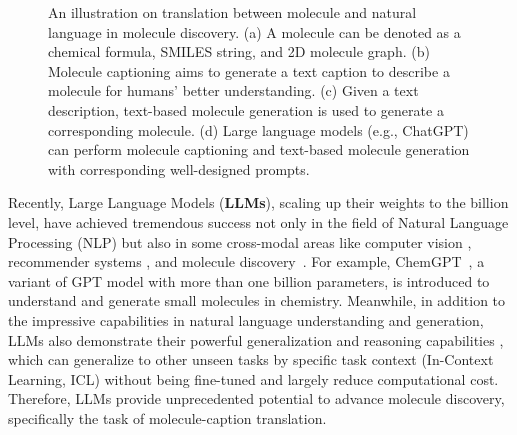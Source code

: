 \documentclass{article}
\theoremstyle{plain}
\theoremstyle{definition}
\theoremstyle{remark}
\begin{document}
\begin{figure}[t]
\centering
\begin{minipage}{3cm}
\vspace{1cm}
\end{minipage}
\caption{An illustration on translation between molecule and natural language in molecule discovery. (a) A molecule can be denoted as a chemical formula, SMILES string, and 2D molecule graph.
(b) Molecule captioning aims to generate a text caption to describe a molecule for humans' better understanding. 
(c) Given a text description, text-based molecule generation is used to generate a corresponding molecule.
(d) Large language models (e.g., ChatGPT) can perform molecule captioning and text-based molecule generation with corresponding well-designed prompts.}
\label{fig:bot} 
\end{figure}

Recently, Large Language Models (\textbf{LLMs}), scaling up their weights to the billion level, have achieved tremendous success not only in the field of Natural Language Processing (NLP) but also in some cross-modal areas like computer vision \cite{zhu2023minigpt}, recommender systems \cite{bao2023tallrec}, and molecule discovery~\cite{edwards-etal-2022-translation}. 
For example, ChemGPT~\cite{frey2022neural}, a variant of GPT model with more than one billion parameters, is introduced to understand and generate small molecules in chemistry. 
Meanwhile, in addition to the impressive capabilities in  natural language understanding and generation,  LLMs also demonstrate their powerful generalization and reasoning capabilities \cite{rubin2022learning, min2022metaicl}, which can  generalize to other unseen tasks  by  specific task context (In-Context Learning, ICL) without being fine-tuned and largely reduce computational cost. 
Therefore, LLMs provide unprecedented potential to advance molecule discovery, specifically the task of molecule-caption translation.
\end{document}
